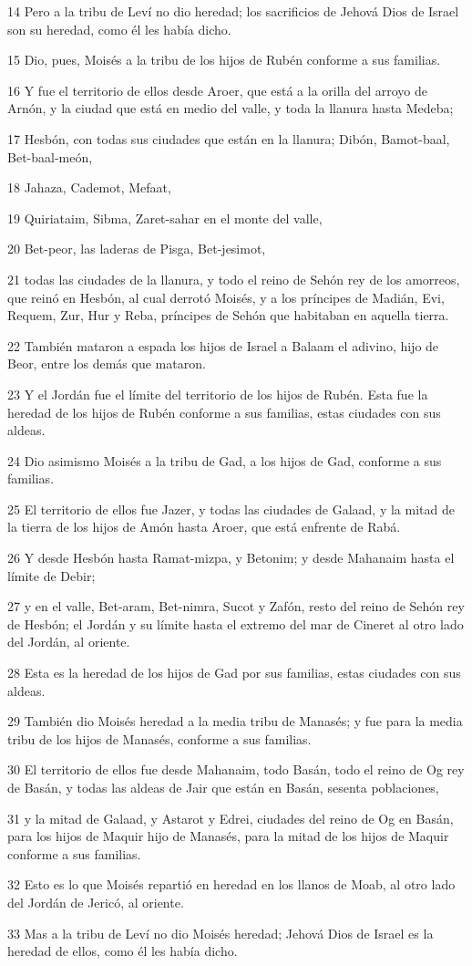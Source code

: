 \par 14 Pero a la tribu de Leví no dio heredad; los sacrificios de Jehová Dios de Israel son su heredad, como él les había dicho. 
\par 15 Dio, pues, Moisés a la tribu de los hijos de Rubén conforme a sus familias.
\par 16 Y fue el territorio de ellos desde Aroer, que está a la orilla del arroyo de Arnón, y la ciudad que está en medio del valle, y toda la llanura hasta Medeba;
\par 17 Hesbón, con todas sus ciudades que están en la llanura; Dibón, Bamot-baal, Bet-baal-meón,
\par 18 Jahaza, Cademot, Mefaat,
\par 19 Quiriataim, Sibma, Zaret-sahar en el monte del valle,
\par 20 Bet-peor, las laderas de Pisga, Bet-jesimot,
\par 21 todas las ciudades de la llanura, y todo el reino de Sehón rey de los amorreos, que reinó en Hesbón, al cual derrotó Moisés, y a los príncipes de Madián, Evi, Requem, Zur, Hur y Reba, príncipes de Sehón que habitaban en aquella tierra.
\par 22 También mataron a espada los hijos de Israel a Balaam el adivino, hijo de Beor, entre los demás que mataron.
\par 23 Y el Jordán fue el límite del territorio de los hijos de Rubén. Esta fue la heredad de los hijos de Rubén conforme a sus familias, estas ciudades con sus aldeas.
\par 24 Dio asimismo Moisés a la tribu de Gad, a los hijos de Gad, conforme a sus familias.
\par 25 El territorio de ellos fue Jazer, y todas las ciudades de Galaad, y la mitad de la tierra de los hijos de Amón hasta Aroer, que está enfrente de Rabá.
\par 26 Y desde Hesbón hasta Ramat-mizpa, y Betonim; y desde Mahanaim hasta el límite de Debir;
\par 27 y en el valle, Bet-aram, Bet-nimra, Sucot y Zafón, resto del reino de Sehón rey de Hesbón; el Jordán y su límite hasta el extremo del mar de Cineret al otro lado del Jordán, al oriente.
\par 28 Esta es la heredad de los hijos de Gad por sus familias, estas ciudades con sus aldeas.
\par 29 También dio Moisés heredad a la media tribu de Manasés; y fue para la media tribu de los hijos de Manasés, conforme a sus familias.
\par 30 El territorio de ellos fue desde Mahanaim, todo Basán, todo el reino de Og rey de Basán, y todas las aldeas de Jair que están en Basán, sesenta poblaciones,
\par 31 y la mitad de Galaad, y Astarot y Edrei, ciudades del reino de Og en Basán, para los hijos de Maquir hijo de Manasés, para la mitad de los hijos de Maquir conforme a sus familias.
\par 32 Esto es lo que Moisés repartió en heredad en los llanos de Moab, al otro lado del Jordán de Jericó, al oriente.
\par 33 Mas a la tribu de Leví no dio Moisés heredad; Jehová Dios de Israel es la heredad de ellos, como él les había dicho. 

